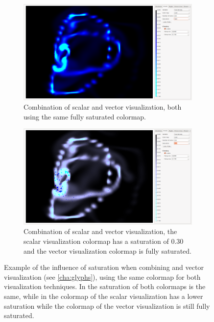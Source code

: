 \begin{figure}[tb]
	\centering
	\begin{subfigure}[t]{0.4\textwidth}
		\centering
		\includegraphics[width=\textwidth, trim={50px 200px 1023px 300px}, clip]{colormapping/img/nosaturation}
		\caption{Combination of scalar and vector visualization, both using the same fully saturated colormap.}
		\label{fig:colormapping:saturation:disabled}
	\end{subfigure}
	\hspace{50px}
	\begin{subfigure}[t]{0.4\textwidth}
		\centering
		\includegraphics[width=\textwidth, trim={50px 200px 1023px 300px}, clip]{colormapping/img/saturation}
		\caption{Combination of scalar and vector visualization, the scalar visualization colormap has a saturation of $0.30$ and the vector visualization colormap is fully saturated.}
		\label{fig:colormapping:saturation:enabled}
	\end{subfigure}	
	\caption{Example of the influence of saturation when combining \smoke and vector visualization (see \cref{cha:glyphs}), using the same colormap for both visualization techniques. In  the saturation of both colormaps is the same, while in  the colormap of the scalar visualization has a lower saturation while the colormap of the vector visualization is still fully saturated. }
	\label{fig:colormaps:saturation}
\end{figure}

